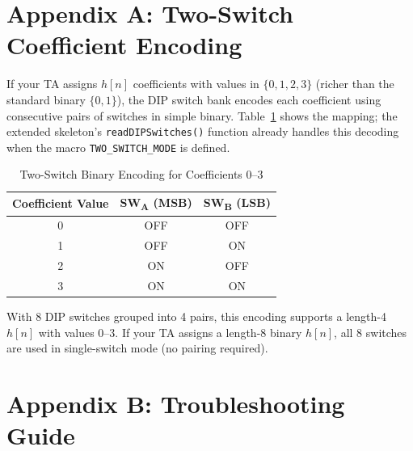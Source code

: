 \documentclass[11pt,letterpaper]{article}
\begin{document}
\section*{Appendix A: Two-Switch Coefficient Encoding}

If your TA assigns $h[n]$ coefficients with values in $\{0, 1, 2, 3\}$ (richer than the standard binary $\{0, 1\}$), the DIP switch bank encodes each coefficient using consecutive pairs of switches in simple binary. Table~\ref{tab:two_switch} shows the mapping; the extended skeleton's \texttt{readDIPSwitches()} function already handles this decoding when the macro \texttt{TWO\_SWITCH\_MODE} is defined.

\begin{table}[H]
    \centering
    \caption{Two-Switch Binary Encoding for Coefficients 0--3}
    \label{tab:two_switch}
    \begin{tabular}{ccc}
    \toprule
    \textbf{Coefficient Value} & \textbf{SW\textsubscript{A} (MSB)} & \textbf{SW\textsubscript{B} (LSB)}\\
    \midrule
    0 & OFF & OFF\\
    1 & OFF & ON\\
    2 & ON  & OFF\\
    3 & ON  & ON\\
    \bottomrule
    \end{tabular}
\end{table}

\noindent With 8 DIP switches grouped into 4 pairs, this encoding supports a length-4 $h[n]$ with values 0--3. If your TA assigns a length-8 binary $h[n]$, all 8 switches are used in single-switch mode (no pairing required).

\section*{Appendix B: Troubleshooting Guide}
\end{document}
